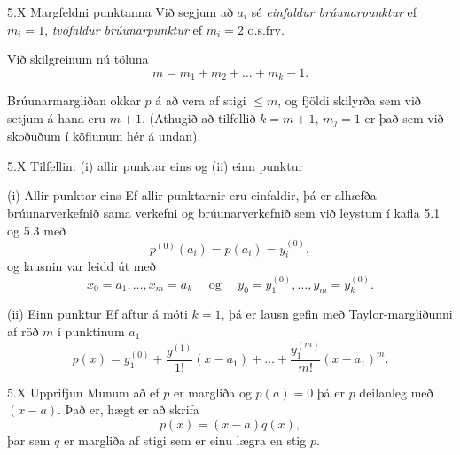 \begin{frame}{5.X Margfeldni punktanna} 
Við segjum að $a_i$ sé \emph{einfaldur
brúunarpunktur} ef $m_i=1$, \emph{tvöfaldur brúunarpunktur}
ef $m_i=2$ o.s.frv.  

\pause
Við skilgreinum nú töluna 
\begin{equation*}
  m = m_1 + m_2 + \ldots + m_k - 1.
\end{equation*}

\pause
Brúunarmargliðan okkar $p$ á að vera af stigi $\leq m$, og 
fjöldi skilyrða sem við setjum á hana eru $m+1$. \pause
(Athugið að tilfellið $k=m+1$, $m_j=1$ er það sem við skoðuðum í 
köflunum hér á undan).
\end{frame}
%
%
\begin{frame}{5.X Tilfellin: (i) allir punktar eins og  (ii)  einn punktur} 
\begin{block}{(i) Allir punktar eins}
Ef allir punktarnir eru einfaldir, þá er 
alhæfða  brúunarverkefnið sama verkefni og
brúunarverkefnið sem við leystum í kafla 5.1 og 5.3
með
$$p^{(0)}(a_i) = p(a_i) = y_i^{(0)},
$$ 
og lausnin var leidd  út  með 
$$
x_0=a_1,\dots,x_m=a_k \quad \text{ og } \quad
y_0=y_1^{(0)},\dots,y_m=y_k^{(0)}.
$$
\end{block}
\pause
\begin{block}{(ii) Einn punktur}
Ef aftur á móti $k = 1$, þá er lausn gefin með Taylor-margliðunni
af röð $m$ í punktinum $a_1$
\begin{equation*}
  p(x) = y_1^{(0)} + \frac{y^{(1)}}{1!}(x - a_1) + 
  \ldots + \frac{y_1^{(m)}}{m!}(x - a_1)^m.
\end{equation*}
\end{block}
\end{frame}

\begin{frame}{5.X Upprifjun}
 Munum að ef $p$ er margliða og $p(a)=0$ þá er 
 $p$ deilanleg með $(x-a)$. Það er, hægt er að skrifa
 $$
 p(x) = (x-a)q(x),
 $$
 þar sem $q$ er margliða af stigi sem er einu lægra en
 stig $p$.
\end{frame}


